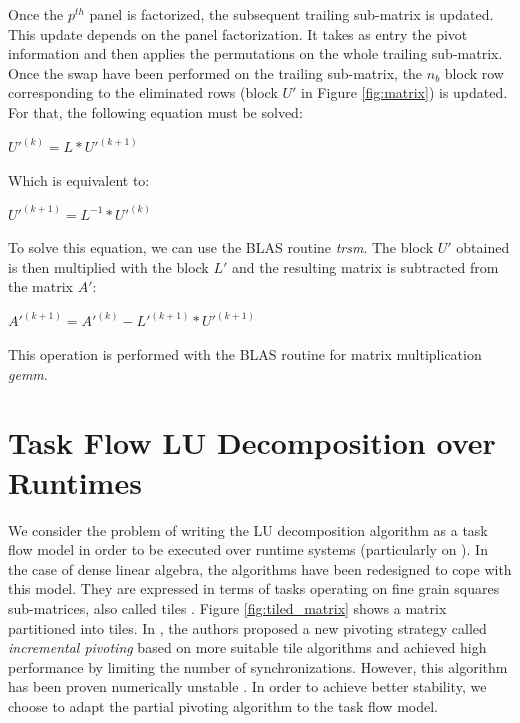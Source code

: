 Once the $p^{th}$ panel is factorized, the subsequent trailing sub-matrix is updated. This update depends on the panel factorization. It takes as entry the pivot information and then applies the permutations on the whole trailing sub-matrix. Once the swap have been performed on the trailing sub-matrix, the $n_b$ block row corresponding to the eliminated rows (block $U'$ in Figure \ref{fig:matrix}) is updated. For that, the following equation must be solved:
\begin{center}
$U'^{(k)} = L*U'^{(k+1)}$
\end{center}
Which is equivalent to:
\begin{center}
$U'^{(k+1)} = L^{-1}*U'^{(k)}$
\end{center}
To solve this equation, we can use the BLAS routine \textit{trsm}. The block $U'$ obtained is then multiplied with the block $L'$ and the resulting matrix is subtracted from the matrix $A'$:
\begin{center}
$A'^{(k+1)} = A'^{(k)} - L'^{(k+1)}*U'^{(k+1)}$
\end{center}
This operation is performed with the BLAS routine for matrix multiplication \textit{gemm}.


\section{Task Flow LU Decomposition over Runtimes \label{task_flow_lu}}
We consider the problem of writing the LU decomposition algorithm as a task flow model in order to be executed over runtime systems (particularly on \dague). In the case of dense linear algebra, the algorithms have been redesigned to cope with this model. They are expressed in terms of tasks operating on fine grain squares sub-matrices, also called tiles \cite{conf/para/ButtariDKLLT06,ChanEtAl07b}. Figure \ref{fig:tiled_matrix} shows a matrix partitioned into tiles. In \cite{Buttari09}, the authors proposed a new pivoting strategy called \emph{incremental pivoting} based on \cite{Quintana-Orti:2009:ULF} more suitable tile algorithms and achieved high performance by limiting the number of synchronizations. However, this algorithm has been proven numerically unstable \cite{journals/siammax/GrigoriDX11}. In order to achieve better stability, we choose to adapt the partial pivoting algorithm to the task flow model.

